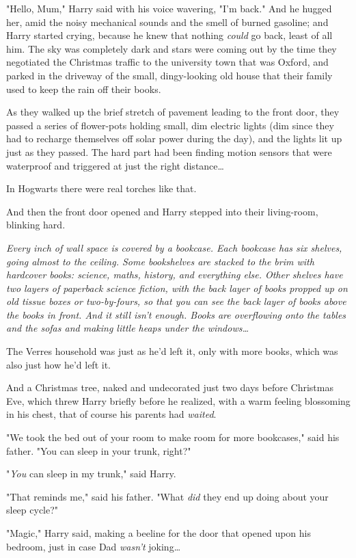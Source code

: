"Hello, Mum," Harry said with his voice wavering, "I'm back." And he hugged
her, amid the noisy mechanical sounds and the smell of burned gasoline; and
Harry started crying, because he knew that nothing \emph{could} go back, least
of all him.
\later
The sky was completely dark and stars were coming out by the time they
negotiated the Christmas traffic to the university town that was Oxford, and
parked in the driveway of the small, dingy-looking old house that their family
used to keep the rain off their books.

As they walked up the brief stretch of pavement leading to the front door, they
passed a series of flower-pots holding small, dim electric lights (dim since
they had to recharge themselves off solar power during the day), and the lights
lit up just as they passed. The hard part had been finding motion sensors that
were waterproof and triggered at just the right distance…

In Hogwarts there were real torches like that.

And then the front door opened and Harry stepped into their living-room,
blinking hard.

\emph{Every inch of wall space is covered by a bookcase. Each bookcase has six
shelves, going almost to the ceiling. Some bookshelves are stacked to the brim
with hardcover books: science, maths, history, and everything else. Other
shelves have two layers of paperback science fiction, with the back layer of
books propped up on old tissue boxes or two-by-fours, so that you can see the
back layer of books above the books in front. And it still isn't enough. Books
are overflowing onto the tables and the sofas and making little heaps under the
windows…}

The Verres household was just as he'd left it, only with more books, which was
also just how he'd left it.

And a Christmas tree, naked and undecorated just two days before Christmas Eve,
which threw Harry briefly before he realized, with a warm feeling blossoming in
his chest, that of course his parents had \emph{waited}.

"We took the bed out of your room to make room for more bookcases," said his
father. "You can sleep in your trunk, right?"

"\emph{You} can sleep in my trunk," said Harry.

"That reminds me," said his father. "What \emph{did} they end up doing about
your sleep cycle?"

"Magic," Harry said, making a beeline for the door that opened upon his
bedroom, just in case Dad \emph{wasn't} joking…

